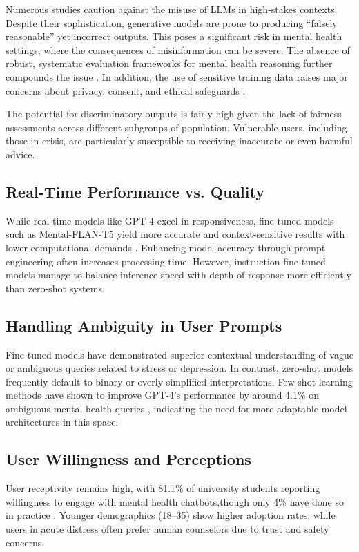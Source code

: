 Numerous studies caution against the misuse of LLMs in high-stakes contexts. Despite their sophistication, generative models are prone to producing “falsely reasonable” yet incorrect outputs. This poses a significant risk in mental health settings, where the consequences of misinformation can be severe. The absence of robust, systematic evaluation frameworks for mental health reasoning further compounds the issue \cite{greco2023}. In addition, the use of sensitive training data raises major concerns about privacy, consent, and ethical safeguards \cite{arriba2024}.

The potential for discriminatory outputs is fairly high given the lack of fairness assessments across different subgroups of population. Vulnerable users, including those in crisis, are particularly susceptible to receiving inaccurate or even harmful advice.

\subsection{Real-Time Performance vs. Quality}

While real-time models like GPT-4 excel in responsiveness, fine-tuned models such as Mental-FLAN-T5 yield more accurate and context-sensitive results with lower computational demands \cite{xu2024}. Enhancing model accuracy through prompt engineering often increases processing time. However, instruction-fine-tuned models manage to balance inference speed with depth of response more efficiently than zero-shot systems.

\subsection{Handling Ambiguity in User Prompts}

Fine-tuned models have demonstrated superior contextual understanding of vague or ambiguous queries related to stress or depression. In contrast, zero-shot models frequently default to binary or overly simplified interpretations. Few-shot learning methods have shown to improve GPT-4’s performance by around 4.1\% on ambiguous mental health queries \cite{xu2024}, indicating the need for more adaptable model architectures in this space.

\subsection{User Willingness and Perceptions}

User receptivity remains high, with 81.1\% of university students reporting willingness to engage with mental health chatbots,though only 4\% have done so in practice \cite{gbollie2023}. Younger demographics (18–35) show higher adoption rates, while users in acute distress often prefer human counselors due to trust and safety concerns.

